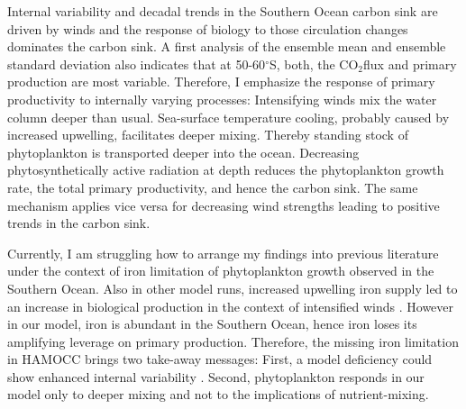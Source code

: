 \documentclass[12pt]{article}
\begin{document}
Internal variability and decadal trends in the Southern Ocean carbon sink are driven by winds and the response of biology to those circulation changes dominates the carbon sink. A first analysis of the ensemble mean and ensemble standard deviation also indicates that at 50-60$^\circ$S, both, the CO$_2$flux and primary production are most variable. Therefore, I emphasize the response of primary productivity to internally varying processes: Intensifying winds mix the water column deeper than usual. Sea-surface temperature cooling, probably caused by increased upwelling, facilitates deeper mixing. Thereby standing stock of phytoplankton is transported deeper into the ocean. Decreasing phytosynthetically active radiation at depth reduces the phytoplankton growth rate, the total primary productivity, and hence the carbon sink. The same mechanism applies vice versa for decreasing wind strengths leading to positive trends in the carbon sink. 

Currently, I am struggling how to arrange my findings into previous literature under the context of iron limitation of phytoplankton growth observed in the Southern Ocean. Also in other model runs, increased upwelling iron supply led to an increase in biological production in the context of intensified winds \citep{Lovenduski2005,Hauck2013,wang2012}. However in our model, iron is abundant in the Southern Ocean, hence iron loses its amplifying leverage on primary production. Therefore, the missing iron limitation in HAMOCC brings two take-away messages: First, a model deficiency could show enhanced internal variability \citep{Nevison2016}. Second, phytoplankton responds in our model only to deeper mixing and not to the implications of nutrient-mixing. 

\newpage 
\baselineskip18pt


\end{document}
